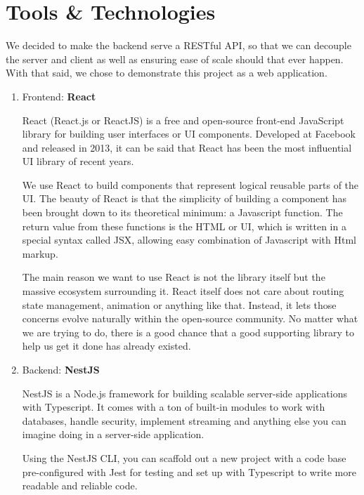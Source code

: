 \documentclass[a4paper]{article}
\numberwithin{equation}{section}
\begin{document}
\section{Tools \& Technologies}


We decided to make the backend serve a RESTful API, so that we can decouple the server and client as well as ensuring ease of scale should that ever happen.
With that said, we chose to demonstrate this project as a web application.

\begin{enumerate}[label=\alph*.]

  \item Frontend: \textbf{React}

        React (React.js or ReactJS) is a free and open-source front-end JavaScript library for building user interfaces or UI components.
        Developed at Facebook and released in 2013, it can be said that React has been the most influential UI library of recent years.

        We use React to build components that represent logical reusable parts of the UI\@.
        The beauty of React is that the simplicity of building a component has been brought down to its theoretical minimum: a Javascript function.
        The return value from these functions is the HTML or UI, which is written in a special syntax called JSX, allowing easy combination of Javascript with Html markup.

        The main reason we want to use React is not the library itself but the massive ecosystem surrounding it.
        React itself does not care about routing state management, animation or anything like that.
        Instead, it lets those concerns evolve naturally within the open-source community.
        No matter what we are trying to do, there is a good chance that a good supporting library to help us get it done has already existed.

  \item Backend: \textbf{NestJS}

        NestJS is a Node.js framework for building scalable server-side applications with Typescript.
        It comes with a ton of built-in modules to work with databases, handle security, implement streaming and anything else you can imagine doing in a server-side application.

        Using the NestJS CLI, you can scaffold out a new project with a code base pre-configured with Jest for testing and set up with Typescript to write more readable and reliable code.


\end{enumerate}
\end{document}
